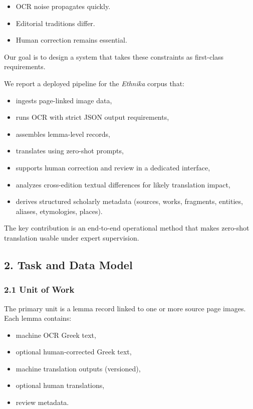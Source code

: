 \documentclass[
]{article}
\providecommand{\tightlist}{%
  \setlength{\itemsep}{0pt}\setlength{\parskip}{0pt}}
\begin{document}
\begin{itemize}
\tightlist
\item
  OCR noise propagates quickly.
\item
  Editorial traditions differ.
\item
  Human correction remains essential.
\end{itemize}

Our goal is to design a system that takes these constraints as
first-class requirements.

We report a deployed pipeline for the \emph{Ethnika} corpus that:

\begin{itemize}
\tightlist
\item
  ingests page-linked image data,
\item
  runs OCR with strict JSON output requirements,
\item
  assembles lemma-level records,
\item
  translates using zero-shot prompts,
\item
  supports human correction and review in a dedicated interface,
\item
  analyzes cross-edition textual differences for likely translation
  impact,
\item
  derives structured scholarly metadata (sources, works, fragments,
  entities, aliases, etymologies, places).
\end{itemize}

The key contribution is an end-to-end operational method that makes
zero-shot translation usable under expert supervision.

\hypertarget{2-task-and-data-model}{%
\subsection{2. Task and Data Model}\label{2-task-and-data-model}}

\hypertarget{21-unit-of-work}{%
\subsubsection{2.1 Unit of Work}\label{21-unit-of-work}}

The primary unit is a lemma record linked to one or more source page
images. Each lemma contains:

\begin{itemize}
\tightlist
\item
  machine OCR Greek text,
\item
  optional human-corrected Greek text,
\item
  machine translation outputs (versioned),
\item
  optional human translations,
\item
  review metadata.
\end{itemize}
\end{document}
